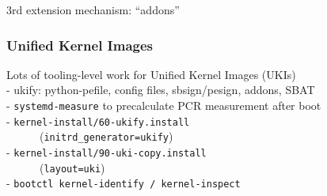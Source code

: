 \documentclass[]{beamer}
\newcommand\pp{}
\begin{document}









\begin{frame}
  3rd extension mechanism: ``addons''
\end{frame}

\begin{frame}[fragile]
  \frametitle{Unified Kernel Images}
  \vfill

  Lots of tooling-level work for Unified Kernel Images (UKIs)\\
  - ukify: python-pefile, config files, sbsign/pesign, addons, SBAT\\
  - \texttt{systemd-measure} to precalculate PCR measurement after boot\\
  - \texttt{kernel-install/60-ukify.install}\\
    ~~~~~~(\texttt{initrd\_generator=ukify})\\
  - \texttt{kernel-install/90-uki-copy.install}\\
    ~~~~~~(\texttt{layout=uki})\\

  - \texttt{bootctl kernel-identify / kernel-inspect}
\end{frame}
\end{document}
